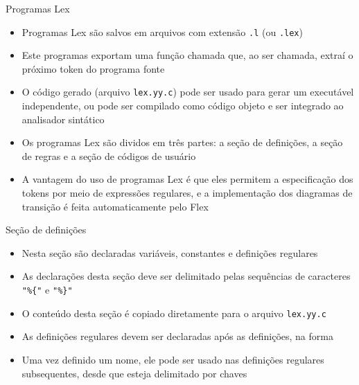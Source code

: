 \begin{frame}[fragile]{Programas Lex}

    \begin{itemize}
        \item Programas Lex são salvos em arquivos com extensão \texttt{.l} (ou \texttt{.lex})

        \item Este programas exportam uma função chamada  que, ao ser chamada, extraí o próximo token do programa fonte

        \item O código gerado (arquivo \texttt{lex.yy.c}) pode ser usado para gerar um executável independente, ou pode ser compilado como código objeto e ser
            integrado ao analisador sintático

        \item Os programas Lex são dividos em três partes: a seção de definições, a seção de regras e a seção de códigos de usuário

        \item A vantagem do uso de programas Lex é que eles permitem a especificação dos tokens por meio de expressões regulares, e a implementação dos
            diagramas de transição é feita automaticamente pelo Flex
    \end{itemize}

\end{frame}

\begin{frame}[fragile]{Seção de definições}

    \begin{itemize}
        \item Nesta seção são declaradas variáveis, constantes e definições regulares

        \item As declarações desta seção deve ser delimitado pelas sequências de caracteres \verb|"%{"| 
            e \verb|"%}"|

        \item O conteúdo desta seção é copiado diretamente para o arquivo \texttt{lex.yy.c}

        \item As definições regulares devem ser declaradas após as definições, na forma

        \item Uma vez definido um nome, ele pode ser usado nas definições regulares subsequentes, desde que esteja delimitado por chaves
    \end{itemize}

\end{frame}

